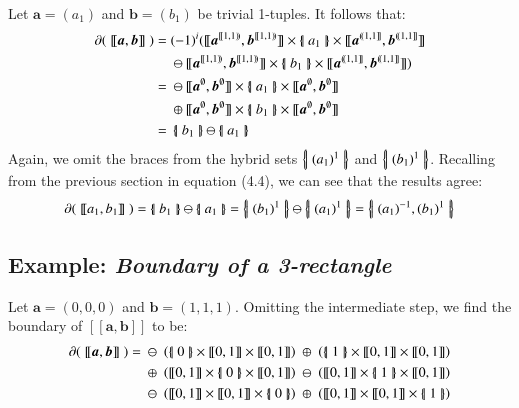 Let $\boldsymbol{a}= (a_1)$ and $\boldsymbol{b} = (b_1)$ be trivial 1-tuples. 
It follows that:
\begin{align*}
	\partial ( \; [\![ \boldsymbol{a}, \boldsymbol{b} ]\!] \; )
	=& \; (-1)^i ( [\![\boldsymbol{a}^{[\![1,1)\!)}, \boldsymbol{b}^{[\![1,1)\!)} ]\!]
	\times \hset{a_1} \times
	[\![\boldsymbol{a}^{(\!(1,1]\!]}, \boldsymbol{b}^{(\!(1,1]\!]} ]\!]\\
	&\; \ominus
	[\![\boldsymbol{a}^{[\![1,1)\!)}, \boldsymbol{b}^{[\![1,1)\!)} ]\!]
	\times \hset{b_1} \times
	[\![\boldsymbol{a}^{(\!(1,1]\!]}, \boldsymbol{b}^{(\!(1,1]\!]} ]\!] )\\
	=& \; \ominus [\![\boldsymbol{a}^{\emptyset}, \boldsymbol{b}^{\emptyset} ]\!]
	\times \hset{a_1} \times
	[\![\boldsymbol{a}^{\emptyset}, \boldsymbol{b}^{\emptyset} ]\!]\\
	& \; \oplus
	[\![\boldsymbol{a}^{\emptyset}, \boldsymbol{b}^{\emptyset} ]\!]
	\times \hset{b_1} \times
	[\![\boldsymbol{a}^{\emptyset}, \boldsymbol{b}^{\emptyset} ]\!] \\
	=& \; \hset{b_1} \ominus \hset{a_1}
\end{align*}
Again, we omit the braces from the hybrid sets $\left\{ \! \left| \; (a_1)^1 \; \right| \! \right\}$ and $\left\{ \! \left| \; (b_1)^1 \; \right| \! \right\}$.
Recalling from the previous section in equation (4.4), we can see that the results agree:
\begin{equation}
	\partial ( \; [\![ a_1 ,b_1 ]\!] \; ) = \hset{b_1} \ominus \hset{a_1} = \hset{(b_1)^1} \ominus \hset{(a_1)^1} = \hset{(a_1)^{-1}, (b_1)^1}
\end{equation}

\subsection{Example: \emph{Boundary of a 3-rectangle}}
Let $\boldsymbol{a} = (0,0,0)$ and $\boldsymbol{b} = (1,1,1)$.
Omitting the intermediate step, we find the boundary of $[\![ \boldsymbol{a}, \boldsymbol{b} ]\!]$ to be:
\begin{align*}
	\partial ( \; [\![ \boldsymbol{a} , \boldsymbol{b} ]\!] \; ) =
	& 	\; \ominus \; \left( \hset{0} \times [\![0,1]\!] \times [\![0,1]\!] \right)
		\; \oplus \; \left( \hset{1} \times [\![0,1]\!] \times [\![0,1]\!] \right)
	\\& 	\; \oplus \; \left( [\![0,1]\!] \times \hset{0} \times [\![0,1]\!] \right)
	 	\; \ominus \; \left( [\![0,1]\!] \times \hset{1} \times [\![0,1]\!] \right)
	\\& 	\; \ominus \; \left( [\![0,1]\!] \times [\![0,1]\!] \times \hset{0} \right)
	  	\; \oplus \; \left( [\![0,1]\!] \times [\![0,1]\!] \times \hset{1} \right)
\end{align*}

